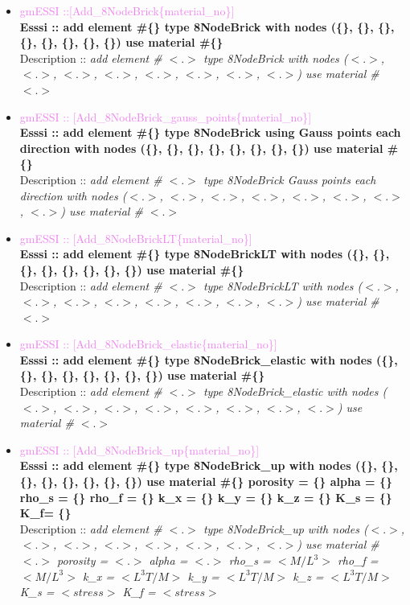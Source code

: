 \documentclass[11pt]{article}
\begin{document}
  \begin{itemize}

      \item \textcolor{violet}{gmESSI ::[Add\_8NodeBrick\{material\_no\}]} \\             
      \textbf{Esssi :: add element \#\{\} type 8NodeBrick with nodes (\{\}, \{\}, \{\}, \{\}, \{\}, \{\}, \{\}, \{\}) use material \#\{\}}\\
      Description :: \textit{ add element \# $<.>$ type 8NodeBrick with nodes ($<.>$, $<.>$, $<.>$, $<.>$, $<.>$, $<.>$, $<.>$, $<.>$) use material \# $<.>$}

      \item \textcolor{violet}{gmESSI :: [Add\_8NodeBrick\_gauss\_points\{material\_no\}]} \\     
      \textbf{Esssi :: add element \#\{\} type 8NodeBrick using  Gauss points each direction with nodes (\{\}, \{\}, \{\}, \{\}, \{\}, \{\}, \{\}, \{\}) use material \#\{\}}\\
      Description :: \textit{ add element \# $<.>$ type 8NodeBrick Gauss points each direction with nodes ($<.>$, $<.>$, $<.>$, $<.>$, $<.>$, $<.>$, $<.>$, $<.>$) use material \# $<.>$}

      \item \textcolor{violet}{gmESSI :: [Add\_8NodeBrickLT\{material\_no\}]} \\           
      \textbf{Esssi :: add element \#\{\} type 8NodeBrickLT with nodes (\{\}, \{\}, \{\}, \{\}, \{\}, \{\}, \{\}, \{\}) use material \#\{\}}\\
      Description :: \textit{ add element \# $<.>$ type 8NodeBrickLT with nodes ($<.>$, $<.>$, $<.>$, $<.>$, $<.>$, $<.>$, $<.>$, $<.>$) use material \# $<.>$}

      \item \textcolor{violet}{gmESSI :: [Add\_8NodeBrick\_elastic\{material\_no\}]} \\     
      \textbf{Esssi :: add element \#\{\} type 8NodeBrick\_elastic with nodes (\{\}, \{\}, \{\}, \{\}, \{\}, \{\}, \{\}, \{\}) use material \#\{\}}\\
      Description :: \textit{ add element \# $<.>$ type 8NodeBrick\_elastic with nodes ($<.>$, $<.>$, $<.>$, $<.>$, $<.>$, $<.>$, $<.>$, $<.>$) use material \# $<.>$}

      \item \textcolor{violet}{gmESSI :: [Add\_8NodeBrick\_up\{material\_no\}]} \\     
      \textbf{Esssi :: add element \#\{\} type 8NodeBrick\_up with nodes (\{\}, \{\}, \{\}, \{\}, \{\}, \{\}, \{\}, \{\}) use material \#\{\} porosity = \{\} alpha = \{\} rho\_s = \{\} rho\_f = \{\} k\_x = \{\} k\_y = \{\} k\_z = \{\} K\_s = \{\} K\_f= \{\}}\\
      Description :: \textit{ add element \# $<.>$ type 8NodeBrick\_up with nodes ($<.>$, $<.>$, $<.>$, $<.>$, $<.>$, $<.>$, $<.>$, $<.>$) use material \# $<.>$ porosity = $<.>$ alpha = $<.>$  rho\_s = $<M/L^3>$  rho\_f = $<M/L^3>$ k\_x = $<L^3T/M>$  k\_y = $<L^3T/M>$  k\_z = $<L^3T/M>$  K\_s = $<stress>$ K\_f = $<stress>$}


\end{itemize}
\end{document}
